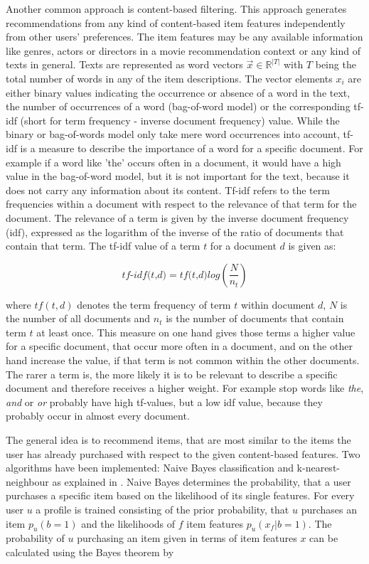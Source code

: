 \documentclass[10pt]{reportMaster}
\begin{document}
Another common approach is content-based filtering.
This approach generates recommendations from any kind of content-based item features independently from other users' preferences.
The item features may be any available information like genres, actors or directors in a movie recommendation context or any kind of texts in general.
Texts are represented as word vectors $\vec{x} \in \mathds{R}^{|T|}$ with $T$ being the total number of words in any of the item descriptions.
The vector elements $x_i$ are either binary values indicating the occurrence or absence of a word in the text, the number of occurrences of a word (bag-of-word model) or the corresponding tf-idf (short for term frequency - inverse document frequency) value.
While the binary or bag-of-words model only take mere word occurrences into account, tf-idf is a measure to describe the importance of a word for a specific document.
For example if a word like 'the' occurs often in a document, it would have a high value in the bag-of-word model, but it is not important for the text, because it does not carry any information about its content.
Tf-idf refers to the term frequencies within a document with respect to the relevance of that term for the document.
The relevance of a term is given by the inverse document frequency (idf), expressed as the logarithm of the inverse of the ratio of documents that contain that term.
The tf-idf value of a term $t$ for a document $d$ is given as:

\begin{equation}
	\textit{tf-idf(t,d)} = \textit{tf(t,d)} log(\frac{N}{n_t})
\end{equation}

where $tf(t,d)$ denotes the term frequency of term $t$ within document $d$, $N$ is the number of all documents and $n_t$ is the number of documents that contain term $t$ at least once. 
This measure on one hand gives those terms a higher value for a specific document, that occur more often in a document, and on the other hand increase the value, if that term is not common within the other documents.
The rarer a term is, the more likely it is to be relevant to describe a specific document and therefore receives a higher weight.
For example stop words like \textit{the}, \textit{and} or \textit{or} probably have high tf-values, but a low idf value, because they probably occur in almost every document.

The general idea is to recommend items, that are most similar to the items the user has already purchased with respect to the given content-based features.
Two algorithms have been implemented: Naive Bayes classification and k-nearest-neighbour as explained in \cite{contentbasedPazzani}.
Naive Bayes determines the probability, that a user purchases a specific item based on the likelihood of its single features.
For every user $u$ a profile is trained consisting of the prior probability, that $u$ purchases an item $p_u(b=1)$ and  the likelihoods of $f$ item features $p_u(x_f|b=1)$.
The probability of $u$ purchasing an item given in terms of item features $x$ can be calculated using the Bayes theorem by 
\end{document}
